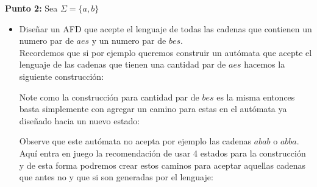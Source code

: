     \textbf{Punto 2: }Sea $\Sigma=\{a,b\}$
\begin{itemize}[label={$\bullet$}]
    \item Diseñar un AFD que acepte el lenguaje de todas las cadenas que contienen un numero par de $aes$ y un numero par de $bes$.\\

     Recordemos que si por ejemplo queremos construir un autómata que acepte el lenguaje de las cadenas que tienen una cantidad par de $aes$ hacemos la siguiente construcción:
    \begin{basedtikz}
    \centering
    \end{basedtikz}
Note como la construcción para cantidad par de $bes$ es la misma entonces basta simplemente con agregar un camino para estas en el autómata ya diseñado hacia un nuevo estado:
\begin{basedtikz}
\centering
    \end{basedtikz}

Observe que este autómata no acepta por ejemplo las cadenas $abab$ o $abba$. Aquí entra en juego la recomendación de usar 4 estados para la construcción y de esta forma podremos crear estos caminos para aceptar aquellas cadenas que antes no y que si son generadas por el lenguaje:


\end{itemize}
